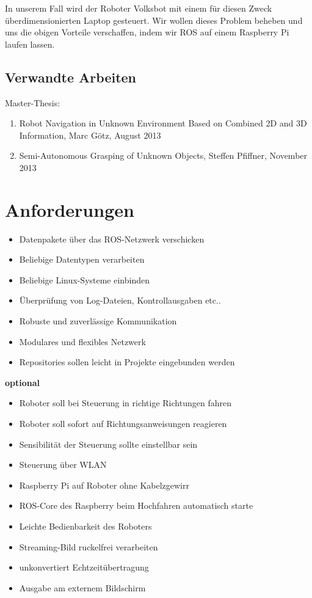 \documentclass[12pt]{article}
\begin{document}
In unserem Fall wird der Roboter Volksbot mit einem für diesen Zweck überdimensionierten Laptop gesteuert. Wir wollen dieses Problem beheben und uns die obigen Vorteile verschaffen, indem wir ROS auf einem Raspberry Pi laufen lassen.

\subsection{Verwandte Arbeiten}

Master-Thesis:
\begin{enumerate}

\item Robot Navigation in Unknown Environment Based on Combined 2D and 3D Information, Marc Götz, August 2013
\item Semi-Autonomous Grasping of Unknown Objects, Steffen Pfiffner, November 2013
\end{enumerate}

\section{Anforderungen}

\begin{itemize}
\item Datenpakete über das ROS-Netzwerk verschicken
\item Beliebige Datentypen verarbeiten
\item Beliebige Linux-Systeme einbinden
\item Überprüfung von Log-Dateien, Kontrollausgaben etc..
\item Robuste und zuverlässige Kommunikation
\item Modulares und flexibles Netzwerk
\item Repositories sollen leicht in Projekte eingebunden werden
\end{itemize}

{\bf optional}

\begin{itemize}
\item Roboter soll bei Steuerung in richtige Richtungen fahren
\item Roboter soll sofort auf Richtungsanweisungen reagieren
\item Sensibilität der Steuerung sollte einstellbar sein
\item Steuerung über WLAN
\item Raspberry Pi auf Roboter ohne Kabelzgewirr %
\item ROS-Core des Raspberry beim Hochfahren automatisch starte
\item Leichte Bedienbarkeit des Roboters

\vspace{0,6cm}

\item Streaming-Bild ruckelfrei verarbeiten
\item unkonvertiert Echtzeitübertragung
\item Ausgabe am externem Bildschirm
\end{itemize}
\end{document}
